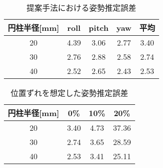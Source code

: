 \documentclass{jsarticle}
\begin{document}
\begin{table}[h]
        \vspace{-1zh}
          \begin{center}
            \caption{提案手法における姿勢推定誤差}
            \label{hyouka}
            \begin{tabular}{c|c|c|c|c} \hline
              円柱半径[mm]   & roll& pitch & yaw&平均 \\ \hline
              20& 4.39 & 3.06 & 2.77 &3.40\\ \hline
              30&2.76 & 2.88 & 2.58& 2.74 \\ \hline
              40&2.52 &2.65  &2.43&2.53 \\ \hline
              \end{tabular}
          \end{center}
        \vspace{-3zh}
\end{table}



\begin{table}[h]
        \vspace{0zh}
          \begin{center}
            \caption{位置ずれを想定した姿勢推定誤差}
            \label{hyouka2}
            \begin{tabular}{c|c|c|c} \hline
              円柱半径[mm]   & 0\%& 10\% & 20\% \\ \hline
              20& 3.40 & 4.73 & 37.36 \\ \hline
              30&2.74 & 3.65 & 28.59 \\ \hline
              40&2.53 &3.41  &25.11 \\ \hline
              \end{tabular}
          \end{center}
        \vspace{-2.5zh}
\end{table}

\end{document}
